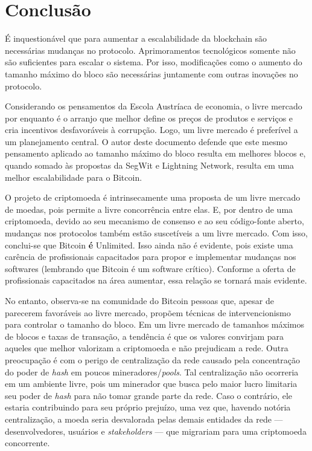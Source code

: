 \chapter{Conclusão}
\label{ch:conclusao}

É inquestionável que para aumentar a escalabilidade da blockchain são necessárias mudanças no protocolo. Aprimoramentos tecnológicos somente não são suficientes para escalar o sistema. Por isso, modificações como o aumento do tamanho máximo do bloco são necessárias juntamente com outras inovações no protocolo.

Considerando os pensamentos da Escola Austríaca de economia, o livre mercado por enquanto é o arranjo que melhor define os preços de produtos e serviços e cria incentivos desfavoráveis à corrupção. Logo, um livre mercado é preferível a um planejamento central. O autor deste documento defende que este mesmo pensamento aplicado ao tamanho máximo do bloco resulta em melhores blocos e, quando somado às propostas da SegWit e Lightning Network, resulta em uma melhor escalabilidade para o Bitcoin.

O projeto de criptomoeda é intrinsecamente uma proposta de um livre mercado de moedas, pois permite a livre concorrência entre elas. E, por dentro de uma criptomoeda, devido ao seu mecanismo de consenso e ao seu código-fonte aberto, mudanças nos protocolos também estão suscetíveis a um livre mercado. Com isso, conclui-se que Bitcoin \textbf{é}  Unlimited. Isso ainda não é evidente, pois existe uma carência de profissionais capacitados para propor e implementar mudanças nos softwares (lembrando que Bitcoin é um software crítico). Conforme a oferta de profissionais capacitados na área aumentar, essa relação se tornará mais evidente.

No entanto, observa-se na comunidade do Bitcoin pessoas que, apesar de parecerem favoráveis ao livre mercado, propõem técnicas de intervencionismo para controlar o tamanho do bloco. Em um livre mercado de tamanhos máximos de blocos e taxas de transação, a tendência é que os valores convirjam para aqueles que melhor valorizam a criptomoeda e não prejudicam a rede. Outra preocupação é com o perigo de centralização da rede causado pela concentração do poder de \textit{hash} em poucos mineradores/\textit{pools}. Tal centralização não ocorreria em um ambiente livre, pois um minerador que busca pelo maior lucro limitaria seu poder de \textit{hash} para não tomar grande parte da rede. Caso o contrário, ele estaria contribuindo para seu próprio prejuízo, uma vez que, havendo notória centralização, a moeda seria desvalorada pelas demais entidades da rede --- desenvolvedores, usuários e \textit{stakeholders} --- que migrariam para uma criptomoeda concorrente.

